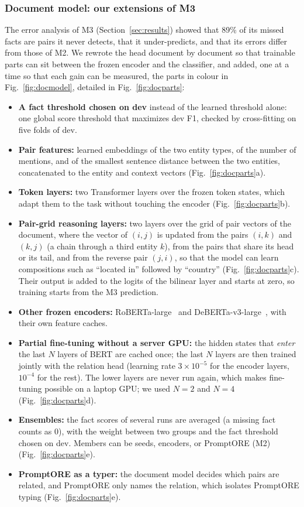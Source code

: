 \documentclass[pdflatex,sn-mathphys-num]{sn-jnl}
\begin{document}
\subsubsection{Document model: our extensions of M3}\label{sec:docmodel}

The error analysis of M3 (Section~\ref{sec:results}) showed that 89\% of its missed facts are pairs it never detects, that it under-predicts, and that its errors differ from those of M2. We rewrote the head document by document so that trainable parts can sit between the frozen encoder and the classifier, and added, one at a time so that each gain can be measured, the parts in colour in Fig.~\ref{fig:docmodel}, detailed in Fig.~\ref{fig:docparts}:

\begin{itemize}
\item \textbf{A fact threshold chosen on dev} instead of the learned threshold alone: one global score threshold that maximizes dev F1, checked by cross-fitting on five folds of dev.
\item \textbf{Pair features:} learned embeddings of the two entity types, of the number of mentions, and of the smallest sentence distance between the two entities, concatenated to the entity and context vectors (Fig.~\ref{fig:docparts}a).
\item \textbf{Token layers:} two Transformer layers over the frozen token states, which adapt them to the task without touching the encoder (Fig.~\ref{fig:docparts}b).
\item \textbf{Pair-grid reasoning layers:} two layers over the grid of pair vectors of the document, where the vector of $(i,j)$ is updated from the pairs $(i,k)$ and $(k,j)$ (a chain through a third entity $k$), from the pairs that share its head or its tail, and from the reverse pair $(j,i)$, so that the model can learn compositions such as ``located in'' followed by ``country'' (Fig.~\ref{fig:docparts}c). Their output is added to the logits of the bilinear layer and starts at zero, so training starts from the M3 prediction.
\item \textbf{Other frozen encoders:} RoBERTa-large~\cite{liu2019roberta} and DeBERTa-v3-large~\cite{he2023debertav3}, with their own feature caches.
\item \textbf{Partial fine-tuning without a server GPU:} the hidden states that \emph{enter} the last $N$ layers of BERT are cached once; the last $N$ layers are then trained jointly with the relation head (learning rate $3\times10^{-5}$ for the encoder layers, $10^{-4}$ for the rest). The lower layers are never run again, which makes fine-tuning possible on a laptop GPU; we used $N=2$ and $N=4$ (Fig.~\ref{fig:docparts}d).
\item \textbf{Ensembles:} the fact scores of several runs are averaged (a missing fact counts as 0), with the weight between two groups and the fact threshold chosen on dev. Members can be seeds, encoders, or PromptORE (M2) (Fig.~\ref{fig:docparts}e).
\item \textbf{PromptORE as a typer:} the document model decides which pairs are related, and PromptORE only names the relation, which isolates PromptORE typing (Fig.~\ref{fig:docparts}e).
\end{itemize}
\end{document}
